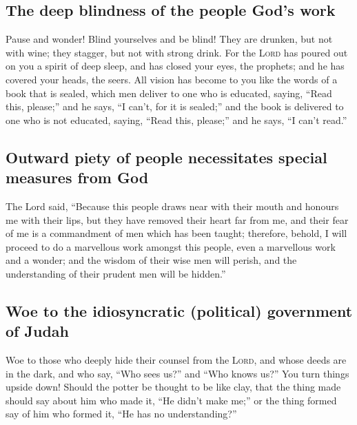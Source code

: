\hypertarget{the-deep-blindness-of-the-people-gods-work}{%
\subsection{The deep blindness of the people God's
work}\label{the-deep-blindness-of-the-people-gods-work}}

 Pause and wonder! Blind yourselves and be blind! They are
drunken, but not with wine; they stagger, but not with strong drink.
 For the \textsc{Lord} has poured out on you a spirit of
deep sleep, and has closed your eyes, the prophets; and he has covered
your heads, the seers.  All vision has become to you like
the words of a book that is sealed, which men deliver to one who is
educated, saying, ``Read this, please;'' and he says, ``I can't, for it
is sealed;''  and the book is delivered to one who is not
educated, saying, ``Read this, please;'' and he says, ``I can't read.''

\hypertarget{outward-piety-of-people-necessitates-special-measures-from-god}{%
\subsection{Outward piety of people necessitates special measures from
God}\label{outward-piety-of-people-necessitates-special-measures-from-god}}

 The Lord said, ``Because this people draws near with
their mouth and honours me with their lips, but they have removed their
heart far from me, and their fear of me is a commandment of men which
has been taught;  therefore, behold, I will proceed to do
a marvellous work amongst this people, even a marvellous work and a
wonder; and the wisdom of their wise men will perish, and the
understanding of their prudent men will be hidden.''

\hypertarget{woe-to-the-idiosyncratic-political-government-of-judah}{%
\subsection{Woe to the idiosyncratic (political) government of
Judah}\label{woe-to-the-idiosyncratic-political-government-of-judah}}

 Woe to those who deeply hide their counsel from the
\textsc{Lord}, and whose deeds are in the dark, and who say, ``Who sees
us?'' and ``Who knows us?''  You turn things upside down!
Should the potter be thought to be like clay, that the thing made should
say about him who made it, ``He didn't make me;'' or the thing formed
say of him who formed it, ``He has no understanding?''

